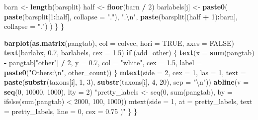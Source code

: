 \documentclass[
]{article}
\newenvironment{Shaded}{\begin{snugshade}}{\end{snugshade}}
\newcommand{\CharTok}[1]{\textcolor[rgb]{0.31,0.60,0.02}{#1}}
\newcommand{\ControlFlowTok}[1]{\textcolor[rgb]{0.13,0.29,0.53}{\textbf{#1}}}
\newcommand{\DataTypeTok}[1]{\textcolor[rgb]{0.13,0.29,0.53}{#1}}
\newcommand{\DecValTok}[1]{\textcolor[rgb]{0.00,0.00,0.81}{#1}}
\newcommand{\FloatTok}[1]{\textcolor[rgb]{0.00,0.00,0.81}{#1}}
\newcommand{\KeywordTok}[1]{\textcolor[rgb]{0.13,0.29,0.53}{\textbf{#1}}}
\newcommand{\NormalTok}[1]{#1}
\newcommand{\OperatorTok}[1]{\textcolor[rgb]{0.81,0.36,0.00}{\textbf{#1}}}
\newcommand{\OtherTok}[1]{\textcolor[rgb]{0.56,0.35,0.01}{#1}}
\newcommand{\StringTok}[1]{\textcolor[rgb]{0.31,0.60,0.02}{#1}}
\begin{document}
\begin{Shaded}
\begin{Highlighting}[]
\NormalTok{                barn \textless{}{-}}\StringTok{ }\KeywordTok{length}\NormalTok{(barsplit)}
\NormalTok{                half \textless{}{-}}\StringTok{ }\KeywordTok{floor}\NormalTok{(barn }\OperatorTok{/}\StringTok{ }\DecValTok{2}\NormalTok{)}
\NormalTok{                barlabels[j] \textless{}{-}}\StringTok{ }\KeywordTok{paste0}\NormalTok{(}
                    \KeywordTok{paste}\NormalTok{(barsplit[}\DecValTok{1}\OperatorTok{:}\NormalTok{half], }\DataTypeTok{collapse =} \StringTok{"."}\NormalTok{),}
                    \StringTok{".}\CharTok{\textbackslash{}n}\StringTok{"}\NormalTok{,}
                    \KeywordTok{paste}\NormalTok{(barsplit[(half }\OperatorTok{+}\StringTok{ }\DecValTok{1}\NormalTok{)}\OperatorTok{:}\NormalTok{barn], }\DataTypeTok{collapse =} \StringTok{"."}\NormalTok{)}
\NormalTok{                )}
\NormalTok{            \}}
\NormalTok{        \}}

        \KeywordTok{barplot}\NormalTok{(}\KeywordTok{as.matrix}\NormalTok{(pangtab),}
            \DataTypeTok{col =}\NormalTok{ colvec, }\DataTypeTok{hori =} \OtherTok{TRUE}\NormalTok{, }\DataTypeTok{axes =} \OtherTok{FALSE}\NormalTok{)}
        \KeywordTok{text}\NormalTok{(barlabx, }\FloatTok{0.7}\NormalTok{, barlabels, }\DataTypeTok{cex =} \FloatTok{1.5}\NormalTok{)}
        \ControlFlowTok{if}\NormalTok{ (add\_other) \{}
            \KeywordTok{text}\NormalTok{(}\DataTypeTok{x =} \KeywordTok{sum}\NormalTok{(pangtab) }\OperatorTok{{-}}\StringTok{ }\NormalTok{pangtab[}\StringTok{"other"}\NormalTok{] }\OperatorTok{/}\StringTok{ }\DecValTok{2}\NormalTok{,}
            \DataTypeTok{y =} \FloatTok{0.7}\NormalTok{, }\DataTypeTok{col =} \StringTok{"white"}\NormalTok{, }\DataTypeTok{cex =} \FloatTok{1.5}\NormalTok{,}
            \DataTypeTok{label =} \KeywordTok{paste0}\NormalTok{(}\StringTok{"Others:}\CharTok{\textbackslash{}n}\StringTok{"}\NormalTok{, other\_count))}
\NormalTok{        \}}
        \KeywordTok{mtext}\NormalTok{(}\DataTypeTok{side =} \DecValTok{2}\NormalTok{, }\DataTypeTok{cex =} \DecValTok{1}\NormalTok{, }\DataTypeTok{las =} \DecValTok{1}\NormalTok{,}
            \DataTypeTok{text =} \KeywordTok{paste}\NormalTok{(}\KeywordTok{substr}\NormalTok{(taxons[i], }\DecValTok{1}\NormalTok{, }\DecValTok{3}\NormalTok{),}
                \KeywordTok{substr}\NormalTok{(taxons[i], }\DecValTok{4}\NormalTok{, }\DecValTok{20}\NormalTok{), }\DataTypeTok{sep =} \StringTok{"}\CharTok{\textbackslash{}n}\StringTok{"}\NormalTok{))}
        \KeywordTok{abline}\NormalTok{(}\DataTypeTok{v =} \KeywordTok{seq}\NormalTok{(}\DecValTok{0}\NormalTok{, }\DecValTok{10000}\NormalTok{, }\DecValTok{1000}\NormalTok{), }\DataTypeTok{lty =} \DecValTok{2}\NormalTok{)}
        \StringTok{"pretty\_labels \textless{}{-} seq(0, sum(pangtab),}
\StringTok{                by = ifelse(sum(pangtab) \textless{} 2000, 100, 1000))}
\StringTok{        mtext(side = 1,}
\StringTok{            at = pretty\_labels,}
\StringTok{            text = pretty\_labels,}
\StringTok{            line = 0,}
\StringTok{            cex = 0.75}
\StringTok{        )"}
\NormalTok{    \}}
\NormalTok{\}}
\end{Highlighting}
\end{Shaded}
\end{document}
